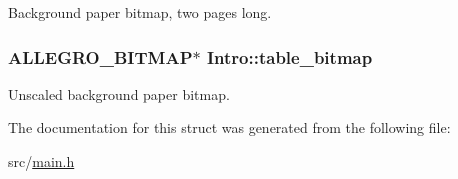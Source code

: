 Background paper bitmap, two pages long. \hypertarget{structIntro_a77ea358d1f44d69e5477f5dedfc9fd2b}{
\subsubsection[{table\-\_\-bitmap}]{\setlength{\rightskip}{0pt plus 5cm}A\-L\-L\-E\-G\-R\-O\-\_\-\-B\-I\-T\-M\-A\-P$\ast$ Intro\-::table\-\_\-bitmap}}\label{structIntro_a77ea358d1f44d69e5477f5dedfc9fd2b}
Unscaled background paper bitmap. 

The documentation for this struct was generated from the following file\-:\begin{DoxyCompactItemize}
\item 
src/\hyperlink{main_8h}{main.\-h}\end{DoxyCompactItemize}
